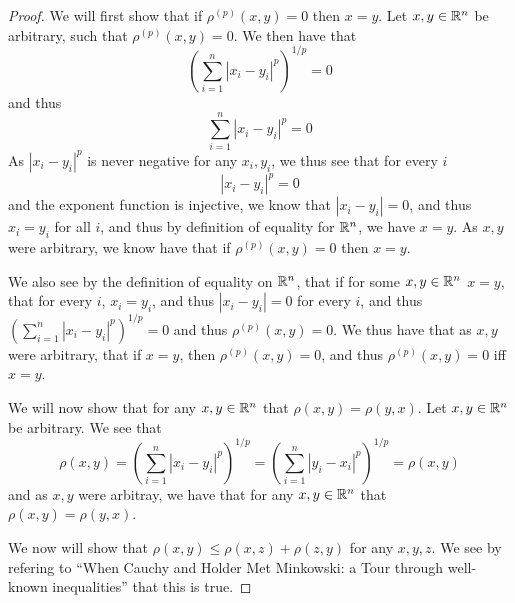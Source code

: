 \begin{proof}
  We will first show that if $\rho^{(p)}(x,y)=0$ then $x=y$. Let $x,y
  \in \mathbb{R}^n$ be arbitrary, such that $\rho^{(p)}(x,y)=0$. We then have that 
  $$(\sum_{i=1}^n |x_i - y_i|^p)^{1/p} =0$$
  and thus
  $$\sum_{i=1}^n |x_i - y_i|^p =0$$
  As $|x_i - y_i|^p$ is never negative for any $x_i,y_i$, we thus see
  that for every $i$
  $$|x_i - y_i|^p =0$$ and the exponent function is injective, we know
  that $|x_i - y_i|=0$, and thus $x_i=y_i$ for all $i$, and thus by
  definition of equality for $\mathbb{R}^n$, we have $x=y$. As $x,y$ were
  arbitrary, we know have that  if $\rho^{(p)}(x,y)=0$ then $x=y$.

  We also see by the definition of equality on $\mathbb{R}^n$, that if for
  some $x,y\in \mathbb{R}^n$ $x=y$, that for
  every $i$, $x_i=y_i$, and thus $|x_i-y_i|=0$ for every $i$, and thus
  $(\sum_{i=1}^n |x_i - y_i|^p)^{1/p}=0$  and thus
  $\rho^{(p)}(x,y)=0$. We thus have that as $x,y$ were arbitrary, that
  if $x=y$, then $\rho^{(p)}(x,y)=0$, and thus $\rho^{(p)}(x,y)=0$ iff
  $x=y$.

  We will now show that for any $x,y\in \mathbb{R}^n$ that
  $\rho(x,y)=\rho(y,x)$. Let $x,y\in \mathbb{R}^n$ be arbitrary.
  We see that 
  $$\rho(x,y) = 
  (\sum_{i=1}^n |x_i - y_i|^p)^{1/p}= 
  (\sum_{i=1}^n |y_i - x_i|^p)^{1/p}= 
  \rho(x,y)$$
  and as $x,y$ were arbitray, we have that 
   for any $x,y\in \mathbb{R}^n$ that
  $\rho(x,y)=\rho(y,x)$.

  We now will show that $\rho(x,y) \leq \rho(x,z) + \rho(z,y)$ for any
  $x,y,z$. We see by refering to ``When Cauchy and Holder Met
  Minkowski: a Tour through well-known inequalities'' that this is true.
\end{proof}

